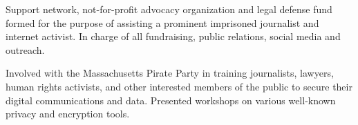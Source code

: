 
\setlength{\leftskip}{1cm}
Support network, not-for-profit advocacy organization and legal defense fund formed for the purpose of assisting a prominent imprisoned journalist and internet activist. In charge of all fundraising, public relations, social media and outreach.

\setlength{\leftskip}{0pt}
\divider

\setlength{\leftskip}{1cm}
Involved with the Massachusetts Pirate Party in training journalists, lawyers, human rights activists, and other interested members of the public to secure their digital communications and data. Presented workshops on various well-known privacy and encryption tools.

\setlength{\leftskip}{0pt}


\addtolength{\rightskip}{-100pt}
\addtolength{\leftskip}{-20pt}

